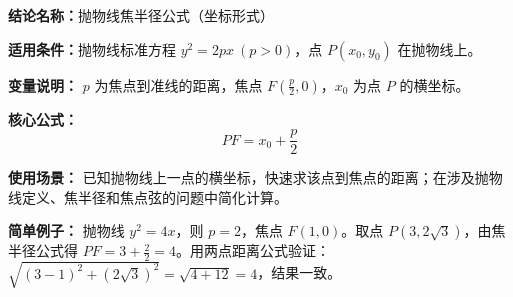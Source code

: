 \textbf{结论名称：}抛物线焦半径公式（坐标形式）

\textbf{适用条件：}抛物线标准方程 \( y^2=2px\ (p>0) \)，点 \( P(x_0,y_0) \) 在抛物线上。

\textbf{变量说明：} \( p \) 为焦点到准线的距离，焦点 \( F(\frac{p}{2},0) \)，\( x_0 \) 为点 \( P \) 的横坐标。

\textbf{核心公式：}
\[
\boxed{PF = x_0 + \frac{p}{2}}
\]

\textbf{使用场景：} 已知抛物线上一点的横坐标，快速求该点到焦点的距离；在涉及抛物线定义、焦半径和焦点弦的问题中简化计算。

\textbf{简单例子：} 抛物线 \( y^2=4x \)，则 \( p=2 \)，焦点 \( F(1,0) \)。取点 \( P(3,2\sqrt{3}) \)，由焦半径公式得 \( PF = 3 + \frac{2}{2} = 4 \)。用两点距离公式验证：\( \sqrt{(3-1)^2+(2\sqrt{3})^2}=\sqrt{4+12}=4 \)，结果一致。